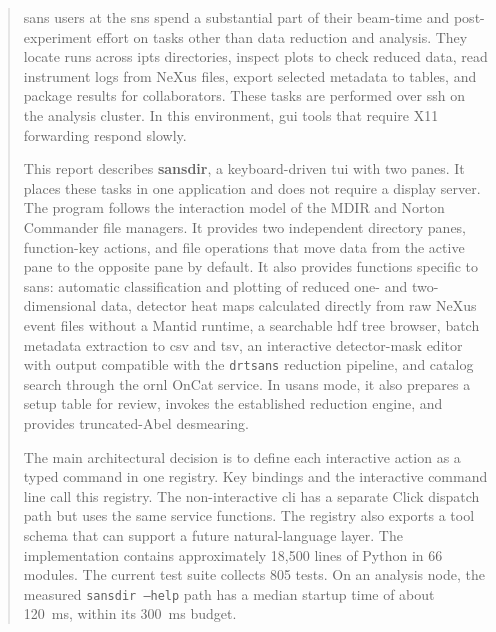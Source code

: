 \documentclass[tm]{ornltm}
\begin{document}
\mainmatter
\begin{abstract}

\Ac{sans} users at the \ac{sns} spend a substantial part of their beam-time and
post-experiment effort on tasks other than data reduction and analysis. They
locate runs across \ac{ipts} directories, inspect plots to check reduced data,
read instrument logs from NeXus files, export selected metadata to tables, and
package results for collaborators. These tasks are performed over \ac{ssh} on
the analysis cluster. In this environment, \ac{gui} tools that require X11
forwarding respond slowly.

This report describes \textbf{sansdir}, a keyboard-driven \ac{tui} with two
panes. It places these tasks in one application and does not require a display
server. The program follows the interaction model of the MDIR and Norton
Commander file managers. It provides two independent directory panes,
function-key actions, and file operations that move data from the active pane to
the opposite pane by default. It also provides functions specific to \ac{sans}:
automatic classification and plotting of reduced one- and two-dimensional data,
detector heat maps calculated directly from raw NeXus event files without a
Mantid runtime, a searchable \ac{hdf} tree browser, batch metadata extraction to
\ac{csv} and \ac{tsv}, an interactive detector-mask editor with output compatible
with the \texttt{drtsans} reduction pipeline, and catalog search through the
\ac{ornl} OnCat service. In \ac{usans} mode, it also prepares a setup table for
review, invokes the established reduction engine, and provides truncated-Abel
desmearing.

The main architectural decision is to define each interactive action as a typed
command in one registry. Key bindings and the interactive command line call this
registry. The non-interactive \ac{cli} has a separate Click dispatch path but
uses the same service functions. The registry also exports a tool schema that
can support a future natural-language layer. The implementation contains
approximately 18,500 lines of Python in 66 modules. The current test suite
collects 805 tests. On an analysis node, the measured
\texttt{sansdir --help} path has a median startup time of about 120~ms, within
its 300~ms budget.

\end{abstract}
\end{document}
